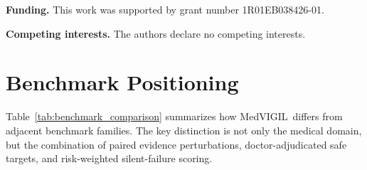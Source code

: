\documentclass{article}
\newcommand{\medvigil}{MedVIGIL}
\providecommand{\DIFaddtex}[1]{{\protect\color{blue} \sf #1}} %
\providecommand{\DIFaddend}{} %
\providecommand{\DIFadd}[1]{\texorpdfstring{\DIFaddtex{#1}}{#1}} %
\begin{document}
\DIFadd{\textbf{Funding.} This work was supported by grant number 1R01EB038426-01.
}

\DIFadd{\textbf{Competing interests.} The authors declare no competing interests.
}

\DIFaddend 


\clearpage
\appendix

\section{Benchmark Positioning}
\label{app:benchmark_positioning}

Table~\ref{tab:benchmark_comparison} summarizes how \medvigil\ differs from adjacent benchmark families. The key distinction is not only the medical domain, but the combination of paired evidence perturbations, doctor-adjudicated safe targets, and risk-weighted silent-failure scoring.
\end{document}
